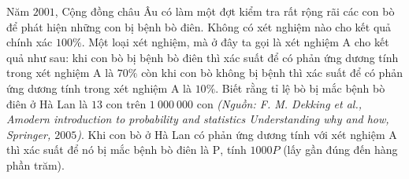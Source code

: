 \begin{ex}%
	Năm $2001$, Cộng đồng châu Âu có làm một đợt kiểm tra rất rộng rãi các con bò để phát hiện những con bị bệnh bò điên. Không có xét nghiệm nào cho kết quả chính xác $100 \%$. Một loại xét nghiệm, mà ở đây ta gọi là xét nghiệm A cho kết quả như sau: khi con bò bị bệnh bò điên thì xác suất để có phản ứng dương tính trong xét nghiệm A là $70 \%$ còn khi con bò không bị bệnh thì xác suất để có phản ứng dương tính trong xét nghiệm A là $10 \%$. Biết rằng tỉ lệ bò bị mắc bệnh bò điên ở Hà Lan là $13$ con trên $1~000~000$ con \textit{(Nguồn: F. M. Dekking et al., Amodern introduction to probability and statistics Understanding why and how, Springer, $2005$)}. Khi con bò ở Hà Lan có phản ứng dương tính với xét nghiệm A thì xác suất để nó bị mắc bệnh bò điên là  $\mathrm{P}$, tính $1000P$ (lấy gần đúng đến hàng phần trăm).
\end{ex}


